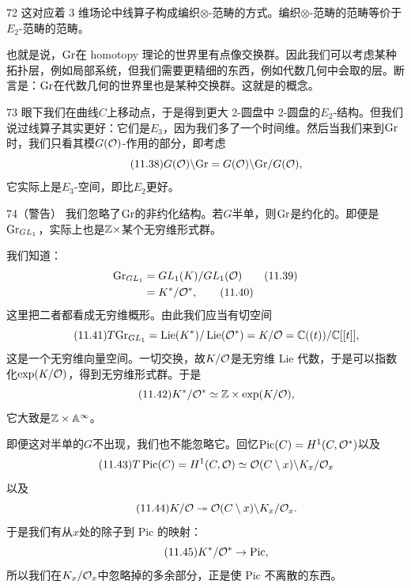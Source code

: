 \begin{srcrem}{72}
这对应着 3 维场论中线算子构成编织$\otimes$-范畴的方式。编织$\otimes$-范畴的范畴等价于$E_2$-范畴的范畴。
\end{srcrem}

也就是说，$\mathrm{Gr}$在 homotopy 理论的世界里有点像交换群。因此我们可以考虑某种拓扑层，例如局部系统，但我们需要更精细的东西，例如代数几何中会取的层。断言是：$\mathrm{Gr}$在代数几何的世界里也是某种交换群。这就是的概念。

\begin{srcrem}{73}
眼下我们在曲线$C$上移动点，于是得到更大 2-圆盘中 2-圆盘的$E_2$-结构。但我们说过线算子其实更好：它们是$E_3$，因为我们多了一个时间维。然后当我们来到$\mathrm{Gr}$时，我们只看其模$G(\mathcal{O})$-作用的部分，即考虑
\begin{equation}\tag{11.38}
G(\mathcal{O})\backslash\mathrm{Gr}=G(\mathcal{O})\backslash\mathrm{Gr}/G(\mathcal{O}),
\end{equation}
它实际上是$E_3$-空间，即比$E_2$更好。
\end{srcrem}

\begin{srcrem}{74}（警告）
我们忽略了$\mathrm{Gr}$的非约化结构。若$G$半单，则$\mathrm{Gr}$是约化的。即便是$\mathrm{Gr}_{GL_1}$，实际上也是$\mathbb{Z}\times$某个无穷维形式群。
\end{srcrem}

我们知道：
\begin{align}
\mathrm{Gr}_{GL_1}&=GL_1(K)/GL_1(\mathcal{O})\tag{11.39}\\
&=K^{*}/\mathcal{O}^{*},\tag{11.40}
\end{align}
这里把二者都看成无穷维概形。由此我们应当有切空间
\begin{equation}\tag{11.41}
T\mathrm{Gr}_{GL_1}=\operatorname{Lie}(K^{*})/\operatorname{Lie}(\mathcal{O}^{*})=K/\mathcal{O}=\mathbb{C}((t))/\mathbb{C}[[t]],
\end{equation}
这是一个无穷维向量空间。一切交换，故$K/\mathcal{O}$是无穷维 Lie 代数，于是可以指数化$\exp(K/\mathcal{O})$，得到无穷维形式群。于是
\begin{equation}\tag{11.42}
K^{*}/\mathcal{O}^{*}\simeq\mathbb{Z}\times\exp(K/\mathcal{O}),
\end{equation}
它大致是$\mathbb{Z}\times\mathbb{A}^{\infty}$。

即便这对半单的$G$不出现，我们也不能忽略它。回忆$\operatorname{Pic}(C)=H^{1}(C,\mathcal{O}^{*})$以及
\begin{equation}\tag{11.43}
T\operatorname{Pic}(C)=H^{1}(C,\mathcal{O})\simeq\mathcal{O}(C\setminus x)\backslash K_x/\mathcal{O}_x
\end{equation}
以及
\begin{equation}\tag{11.44}
K/\mathcal{O}\twoheadrightarrow\mathcal{O}(C\setminus x)\backslash K_x/\mathcal{O}_x.
\end{equation}
于是我们有从$x$处的除子到 Pic 的映射：
\begin{equation}\tag{11.45}
K^{*}/\mathcal{O}^{*}\to\operatorname{Pic},
\end{equation}
所以我们在$K_x/\mathcal{O}_x$中忽略掉的多余部分，正是使 Pic 不离散的东西。

